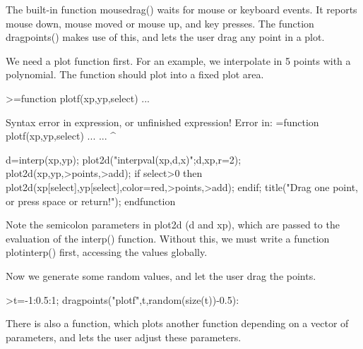 \documentclass{article}
\begin{document}
\begin{eulernotebook}
\begin{eulercomment}
\begin{eulercomment}
\begin{eulercomment}
\begin{eulercomment}
\begin{eulercomment}
\begin{eulercomment}
\begin{eulercomment}
The built-in function mousedrag() waits for mouse or keyboard events. It reports mouse
down, mouse moved or mouse up, and key presses. The function dragpoints() makes use of
this, and lets the user drag any point in a plot.

We need a plot function first. For an example, we interpolate in 5 points with a
polynomial. The function should plot into a fixed plot area.
\end{eulercomment}
\begin{eulerprompt}
>=function plotf(xp,yp,select) ...
\end{eulerprompt}
\begin{euleroutput}
  Syntax error in expression, or unfinished expression!
  Error in:
  =function plotf(xp,yp,select) ... ...
  ^
\end{euleroutput}
\begin{eulerudf}
    d=interp(xp,yp);
    plot2d("interpval(xp,d,x)";d,xp,r=2);
    plot2d(xp,yp,>points,>add);
    if select>0 then
      plot2d(xp[select],yp[select],color=red,>points,>add);
    endif;
    title("Drag one point, or press space or return!");
  endfunction
\end{eulerudf}
\begin{eulercomment}
Note the semicolon parameters in plot2d (d and xp), which are passed to the evaluation
of the interp() function. Without this, we must write a function plotinterp() first,
accessing the values globally.

Now we generate some random values, and let the user drag the points.
\end{eulercomment}
\begin{eulerprompt}
>t=-1:0.5:1; dragpoints("plotf",t,random(size(t))-0.5):
\end{eulerprompt}
\begin{eulercomment}
There is also a function, which plots another function depending on a vector of
parameters, and lets the user adjust these parameters.


\end{eulercomment}
\end{eulercomment}
\end{eulercomment}
\end{eulercomment}
\end{eulercomment}
\end{eulercomment}
\end{eulercomment}
\end{eulernotebook}
\end{document}

